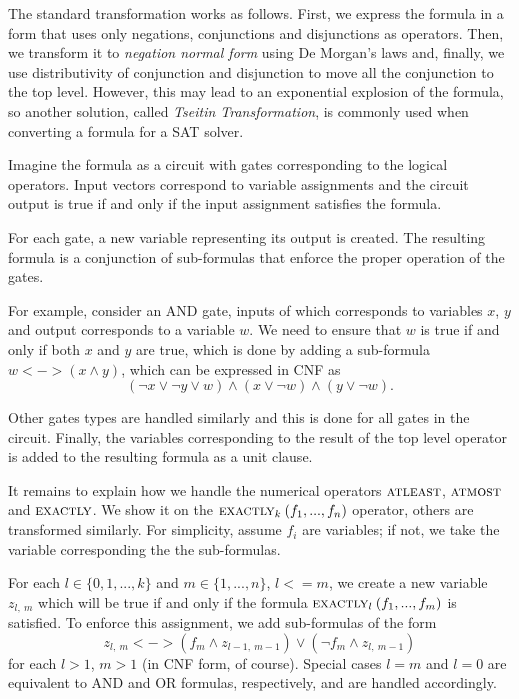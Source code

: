 The standard transformation works as follows.
First, we express the formula in a form
  that uses only negations, conjunctions and disjunctions as operators.
Then, we transform it to \emph{negation normal form} using De Morgan's laws
  and, finally, we use distributivity of conjunction and disjunction to
  move all the conjunction to the top level.
However, this may lead to an exponential explosion of the formula, so
another solution, called \emph{Tseitin Transformation}, is commonly used
  when converting a formula for a SAT solver\cite{tseitin}.

Imagine the formula as a circuit with gates corresponding to the logical operators.
Input vectors correspond to variable assignments and the circuit output
  is true if and only if the input assignment satisfies the formula.

For each gate, a new variable representing its output is created.
The resulting formula is a conjunction of sub-formulas that enforce
  the proper operation of the gates.

For example, consider an AND gate, inputs of which corresponds to variables
  $x$, $y$ and output corresponds to a variable $w$.
We need to ensure that $w$ is true if and only if both $x$ and $y$ are true,
  which is done by adding a sub-formula $w <-> (x \wedge y)$, which can be
  expressed in CNF as
\[
(\neg x \vee \neg y \vee w) \wedge
(x \vee \neg w) \wedge
(y \vee \neg w).
\]

Other gates types are handled similarly and this is done for all gates in the circuit.
Finally, the variables
  corresponding to the result of the top level operator is added
  to the resulting formula as a unit clause.

It remains to explain how we handle the numerical operators
  $\textsc{atleast}$, $\textsc{atmost}$ and $\textsc{exactly}$.
We show it on the $\textsc{exactly}_{k}\:(f_1, ..., f_n)$ operator,
  others are transformed similarly. For simplicity,
  assume $f_i$ are variables; if not, we take the variable corresponding the
  the sub-formulas.

For each $l\in\{0,1,...,k\}$ and $m\in\{1,...,n\}$, $l <= m$, we create
  a new variable $z_{l,\:m}$ which will be true if and only if
  the formula $\textsc{exactly}_{l}\:(f_1, ..., f_m)$ is satisfied.
To enforce this assignment, we add sub-formulas of the form
  \[ z_{l,\:m} <-> (f_m \wedge z_{l-1,\:m-1}) \vee (\neg f_m \wedge z_{l,\:m-1}) \]
  for each $l > 1$, $m > 1$ (in CNF form, of course).
Special cases $l = m$ and $l = 0$ are equivalent to AND and OR formulas, respectively,
  and are handled accordingly.


